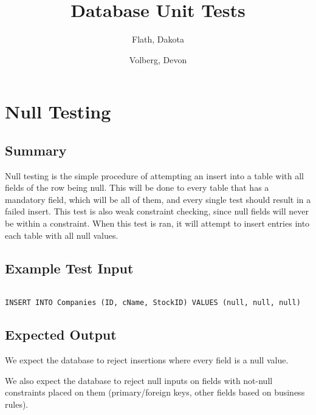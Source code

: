 \documentclass[12pt]{article}
\author{
	Flath, Dakota\\
	\and
	Volberg, Devon\\
}
\begin{document}
\renewcommand{\baselinestretch}{1.15} %
\setlength{\parindent}{0pt} %
\setlength{\parskip}{0.8em} %

\title{Database Unit Tests}
\maketitle

\section{Null Testing}

\subsection{Summary}

Null testing is the simple procedure of attempting an insert into a table with all fields of the row being null. This will be done to every table that has a mandatory field, which will be all of them, and every single test should result in a failed insert. This test is also weak constraint checking, since null fields will never be within a constraint. When this test is ran, it will attempt to insert entries into each table with all null values.

\subsection{Example Test Input}

\begin{verbatim}

INSERT INTO Companies (ID, cName, StockID) VALUES (null, null, null)

\end{verbatim}

\subsection{Expected Output}

We expect the database to reject insertions where every field is a null value.

We also expect the database to reject null inputs on fields with not-null constraints placed on them (primary/foreign keys, other fields based on business rules). 
\end{document}
